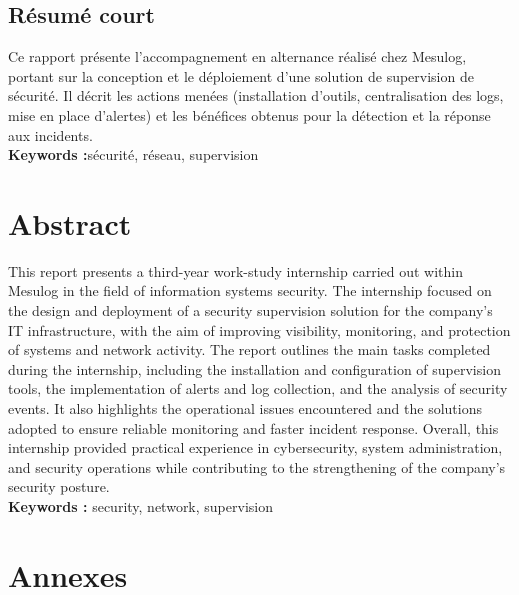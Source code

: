 \documentclass[a4paper, 11pt]{article}
\begin{document}
\begingroup
\let\clearpage\relax
\let\cleardoublepage\relax
\let\cleardoublepage\relax
\small

\newpage
\noindent
\subsection*{Résumé court}

Ce rapport présente l'accompagnement en alternance réalisé chez Mesulog, portant sur la conception et le déploiement d'une solution de supervision de sécurité.
 Il décrit les actions menées (installation d'outils, centralisation des logs, mise en place d'alertes) et les bénéfices obtenus pour la détection et la réponse
  aux incidents.
\noindent
\hbox{}\\
\textbf{Keywords :}sécurité, réseau, supervision\newline


\section*{Abstract}
 
This report presents a third-year work-study internship carried out within Mesulog in the field of information systems security. 
The internship focused on the design and deployment of a security supervision solution for the company’s IT infrastructure, with
 the aim of improving visibility, monitoring, and protection of systems and network activity. The report outlines the main tasks completed
  during the internship, including the installation and configuration of supervision tools, the implementation of alerts and log collection,
   and the analysis of security events. It also highlights the operational issues encountered and the solutions adopted to ensure reliable monitoring
    and faster incident response. Overall, this internship provided practical experience in cybersecurity, system administration, and security operations
     while contributing to the strengthening of the company’s security posture.
\noindent
\hbox{}\\
\textbf{Keywords :} security, network, supervision\newline
 
\vfill
{}

 


\newpage
\section*{Annexes}
\end{document}
